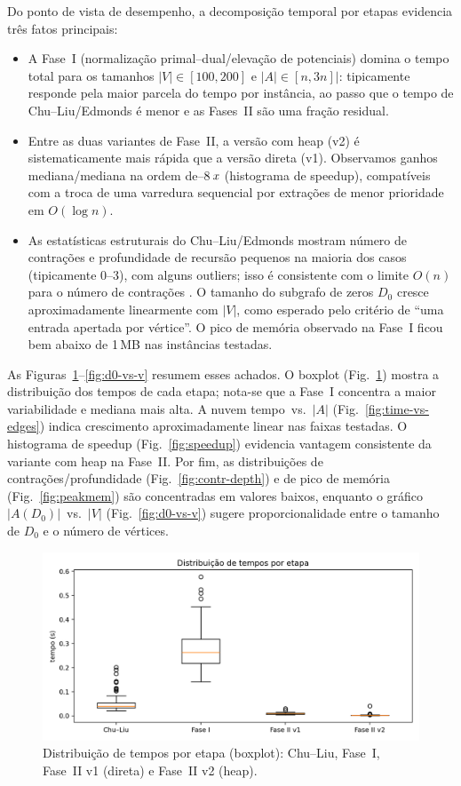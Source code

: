 \documentclass[12pt,a4paper]{article}
\def\emph#1{#1}%
\def\times{\string x}%
\begin{document}
Do ponto de vista de desempenho, a decomposição temporal por etapas evidencia três fatos principais:
\begin{itemize}\setlength{\itemsep}{2pt}
        \item A Fase~I (normalização primal--dual/elevação de potenciais) domina o tempo total para os tamanhos \(|V|\in[100,200]\) e \(|A|\in[n,3n]|\): tipicamente responde pela maior parcela do tempo por instância, ao passo que o tempo de \emph{Chu--Liu/Edmonds} é menor e as Fases~II são uma fração residual.
        \item Entre as duas variantes de Fase~II, a versão com heap (v2) é sistematicamente mais rápida que a versão direta (v1). Observamos ganhos mediana/mediana na ordem de--8\,$\times$ (histograma de speedup), compatíveis com a troca de uma varredura sequencial por extrações de menor prioridade em \(O(\log n)\).
        \item As estatísticas estruturais do \emph{Chu--Liu/Edmonds} mostram número de contrações e profundidade de recursão pequenos na maioria dos casos (tipicamente 0--3), com alguns outliers; isso é consistente com o limite \(O(n)\) para o número de contrações \cite{schrijver2003comb}. O tamanho do subgrafo de zeros \(D_0\) cresce aproximadamente linearmente com \(|V|\), como esperado pelo critério de “uma entrada apertada por vértice”. O pico de memória observado na Fase~I ficou bem abaixo de 1\,MB nas instâncias testadas.
\end{itemize}

As Figuras~\ref{fig:times-boxplot}--\ref{fig:d0-vs-v} resumem esses achados. O boxplot (Fig.~\ref{fig:times-boxplot}) mostra a distribuição dos tempos de cada etapa; nota-se que a Fase~I concentra a maior variabilidade e mediana mais alta. A nuvem tempo~vs.~\(|A|\) (Fig.~\ref{fig:time-vs-edges}) indica crescimento aproximadamente linear nas faixas testadas. O histograma de speedup (Fig.~\ref{fig:speedup}) evidencia vantagem consistente da variante com heap na Fase~II. Por fim, as distribuições de contrações/profundidade (Fig.~\ref{fig:contr-depth}) e de pico de memória (Fig.~\ref{fig:peakmem}) são concentradas em valores baixos, enquanto o gráfico \(|A(D_0)|\)~vs.~\(|V|\) (Fig.~\ref{fig:d0-vs-v}) sugere proporcionalidade entre o tamanho de \(D_0\) e o número de vértices.

\begin{figure}[H]
    \centering
    \includegraphics[width=.85\linewidth]{figures/fig_times_boxplot.png}
    \caption{Distribuição de tempos por etapa (boxplot): \emph{Chu--Liu}, Fase~I, Fase~II v1 (direta) e Fase~II v2 (heap).}
    \label{fig:times-boxplot}
\end{figure}
\end{document}
